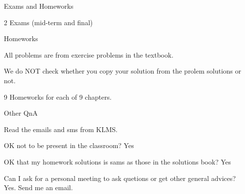 






\begin{frame}{Exams and Homeworks}

\bci

\item 2 Exams (mid-term and final)

\item<2-> Homeworks

  \bci
     \item All problems are from exercise problems in the textbook.
       \item We do NOT check whether you copy your solution from the
         prolem solutions or not. 
       \eci
  


\item<3-> 9 Homeworks for each of 9 chapters.

 

  \eci

\end{frame}

\begin{frame}{Other QnA}

\bci

\item Read  the emails and sms from KLMS. 


\item<2-> OK not to be present in the classroom? Yes

  \item <3-> OK that my homework solutions is sams as those in the
    solutions book? Yes 

\item<3-> Can I ask for a personal meeting to ask quetions or get
  other general advices? Yes. Send me an email.
  
    \eci

\end{frame}


